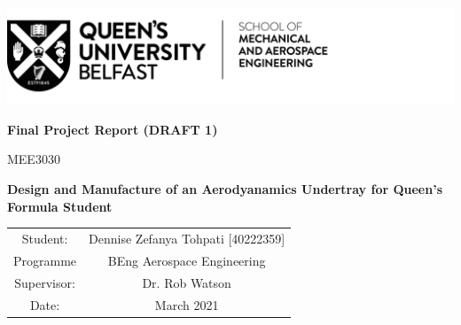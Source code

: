 \begin{titlepage}
\includegraphics[scale=1]{Figures/QUB LOGO - SMAE.png}
\centering

\vspace{3cm}
\textbf{Final Project Report (DRAFT 1)}

MEE3030

\vspace{3cm}
\textbf{Design and Manufacture of an Aerodyanamics Undertray for Queen's Formula Student}


\vspace{7cm}
\begin{tabular}{cc}
    Student: &  \quad Dennise Zefanya Tohpati [40222359]\\
    Programme & \quad BEng Aerospace Engineering\\
    Supervisor: & \quad Dr. Rob Watson\\
    Date: & \quad 16 March 2021
    
    
\end{tabular}
\newpage
\end{titlepage}
